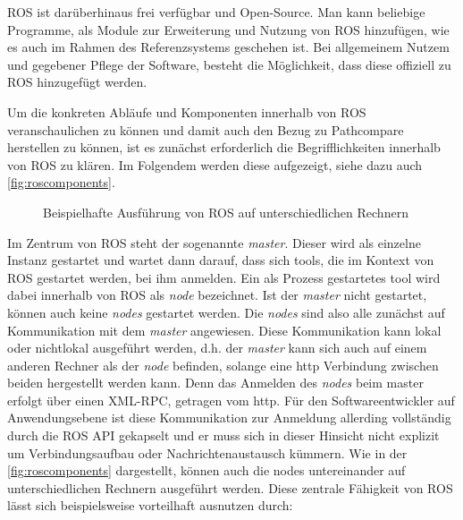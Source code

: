 
ROS ist darüberhinaus frei verfügbar und Open-Source. Man kann beliebige
Programme, als Module zur Erweiterung und Nutzung von ROS hinzufügen, wie
es auch im Rahmen des Referenzsystems geschehen ist. Bei allgemeinem Nutzem und
gegebener Pflege der Software, besteht die Möglichkeit, dass diese offiziell zu
ROS hinzugefügt werden.

Um die konkreten Abläufe und Komponenten innerhalb von ROS
veranschaulichen zu können und damit auch den Bezug zu Pathcompare herstellen
zu können, ist es zunächst erforderlich die Begrifflichkeiten innerhalb von
ROS zu klären. Im Folgendem werden diese aufgezeigt, siehe dazu auch
\autoref{fig:roscomponents}.

\begin{figure}[t]
  \begin{center}
  \end{center}
  \caption{Beispielhafte Ausführung von ROS auf unterschiedlichen Rechnern}
  \label{fig:roscomponents}
\end{figure}

Im Zentrum von ROS steht der sogenannte \textit{master}. Dieser wird als
einzelne Instanz gestartet und wartet dann darauf, dass sich tools, die im
Kontext von ROS gestartet werden, bei ihm anmelden. Ein als Prozess gestartetes
tool wird dabei innerhalb von ROS als \textit{node} bezeichnet. Ist der
\textit{master} nicht gestartet, können auch keine \textit{nodes} gestartet
werden. Die \textit{nodes} sind also alle zunächst auf Kommunikation mit dem
\textit{master} angewiesen. Diese Kommunikation kann lokal oder nichtlokal
ausgeführt werden, d.h. der \textit{master} kann sich auch auf einem anderen
Rechner als der \textit{node} befinden, solange eine http Verbindung zwischen
beiden hergestellt werden kann. Denn das Anmelden des \textit{nodes} beim
master erfolgt über einen \gls{XML-RPC}, getragen vom http. Für den 
Softwareentwickler auf Anwendungsebene ist diese Kommunikation zur Anmeldung allerding
vollständig durch die ROS API gekapselt und er muss sich in dieser Hinsicht
nicht explizit um Verbindungsaufbau oder Nachrichtenaustausch kümmern. Wie in
der \autoref{fig:roscomponents} dargestellt, können auch die nodes
untereinander auf unterschiedlichen Rechnern ausgeführt werden. Diese zentrale
Fähigkeit von ROS lässt sich beispielsweise vorteilhaft ausnutzen durch:

